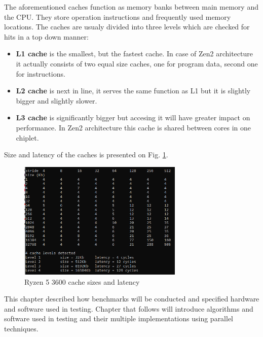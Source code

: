 The aforementioned caches function as memory banks between main memory and the CPU. They store operation instructions and frequently used memory locations. The caches are usualy divided into three levels which are checked for hits in a top down manner:
\begin{itemize}
	\item \textbf{L1 cache} is the smallest, but the fastest cache. In case of Zen2 architecture it actually consists of two equal size caches, one for program data, second one for instructions. 
	\item \textbf{L2 cache} is next in line, it serves the same function as L1 but it is slightly bigger and slightly  slower.
	\item \textbf{L3 cache} is significantly bigger but accesing it will have  greater impact on performance. In Zen2 architecture this cache is shared between cores in one chiplet.  
\end{itemize}

Size and latency of the caches is presented on Fig. \ref{fig:Cache}.

\begin{figure}[!ht]
	\centering
		\includegraphics[width = 0.7\textwidth]{figures03/Cache.PNG}
	\caption{Ryzen 5 3600 cache sizes and latency}
	\label{fig:Cache}
\end{figure}

This chapter described how benchmarks will be conducted and specified hardware and software used in testing. Chapter that follows will introduce algorithms and software used in testing and their multiple implementations using parallel techniques. 
